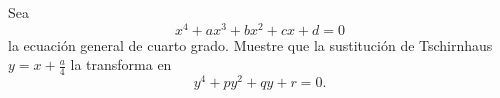 

Sea
\[
x^4 + ax^3 + bx^2 + cx + d = 0
\]
la ecuación general de cuarto grado. Muestre que la sustitución
de Tschirnhaus \( y = x + \frac{a}{4} \) la transforma en
\[
y^4 + py^2 + qy + r = 0.
\]

